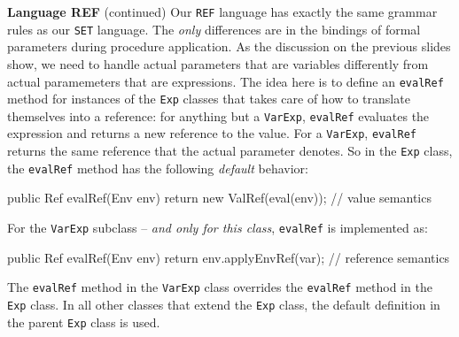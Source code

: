 \begin{minipage}[t]{\sw}
\slidenumber
\LARGE
{\bf Language REF} (continued)\exx
Our \verb'REF' language has exactly the same grammar rules
as our \verb'SET' language.
The {\em only} differences are in the bindings
of formal parameters during procedure application.
As the discussion on the previous slides show,
we need to handle
actual parameters that are variables
differently from
actual paramemeters that are expressions.
The idea here is to define an \verb'evalRef' method
for instances of the \verb'Exp' classes
that takes care of how to translate
themselves into a reference:
for anything but a \verb'VarExp', 
\verb'evalRef' evaluates the expression
and returns a new reference to the value.
For a \verb'VarExp',
\verb'evalRef' returns the same reference
that the actual parameter denotes.\exx
So in the \verb'Exp' class,
the \verb'evalRef' method has the following {\em default} behavior:
{\Large
\begin{qv}
public Ref evalRef(Env env) {
    return new ValRef(eval(env)); // value semantics
}
\end{qv}
}
For the \verb'VarExp' subclass -- {\em and only for this class},
\verb'evalRef' is implemented as:
{\Large
\begin{qv}
public Ref evalRef(Env env) {
    return env.applyEnvRef(var); // reference semantics
}
\end{qv}
}
The \verb'evalRef' method in the \verb'VarExp' class
overrides the \verb'evalRef' method in the \verb'Exp' class.
In all other classes that extend the \verb'Exp' class,
the default definition in the parent \verb'Exp' class is used.
\end{minipage}
\clearpage
